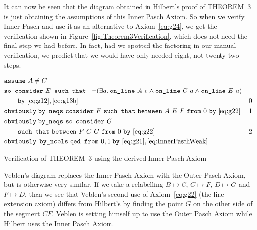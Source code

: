 It can now be seen that the diagram obtained in Hilbert's proof of THEOREM~3 is just obtaining the assumptions of this Inner Pasch Axiom. So when we verify Inner Pasch and use it as an alternative to Axiom~\ref{eq:g24}, we get the verification shown in Figure~\ref{fig:Theorem3Verification}, which does not need the final step we had before. In fact, had we spotted the factoring in our manual verification, we predict that we would have only needed eight, not twenty-two steps.

\begin{boxedfigure}
\begin{align*}
  &\code{assume}\ A\neq C\\
  &\code{so consider}\ E \code{ such that }\ \Triangle{a}{A}{C}{E}\\
  &\qquad\code{by}\ \eqref{eq:g12},\eqref{eq:g13b}& 0\\
  &\code{obviously}\ \code{by\_neqs}\ \code{consider}\ F\ \code{such that}\ \between{A}{E}{F}\ \code{from}\ 0\ \code{by}\ \eqref{eq:g22} & 1\\
  &\code{obviously}\ \code{by\_neqs}\ \code{so consider}\ G\\
  &\qquad\code{such that}\ \between{F}{C}{G}\ \code{from}\ 0\ \code{by}\ \eqref{eq:g22} & 2\\
  &\code{obviously by\_ncols}\ \code{qed from}\ 0,1\ \code{by}\ \eqref{eq:g21},\eqref{eq:InnerPaschWeak}
\end{align*}
\caption{Verification of THEOREM~3 using the derived Inner Pasch Axiom}
\label{fig:Theorem3Verification}
\end{boxedfigure}

Veblen's diagram replaces the Inner Pasch Axiom with the Outer Pasch Axiom, but is otherwise very similar. If we take a relabelling $B \mapsto C$, $C \mapsto F$, $D \mapsto G$ and $F \mapsto D$, then we see that Veblen's second use of Axiom~\ref{eq:g22} (the line extension axiom) differs from Hilbert's by finding the point $G$ on the other side of the segment $CF$. Veblen is setting himself up to use the Outer Pasch Axiom while Hilbert uses the Inner Pasch Axiom.

